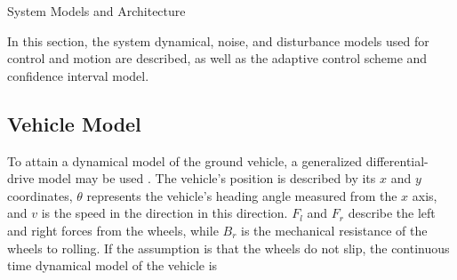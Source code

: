 \begin{section}{System Models and Architecture}
	
\label{sec:modeling}
In this section, the system dynamical, noise, and disturbance models used for control and motion are described, as well as the adaptive control scheme and confidence interval model.


\subsection{Vehicle Model}
To attain a dynamical model of the ground vehicle, a generalized differential-drive model may be used \cite{nutaro2011building}. The vehicle's position is described by its $x$ and $y$ coordinates, $\theta$ represents the vehicle's heading angle measured from the $x$ axis, and $v$ is the speed in the direction in this direction. $F_l$ and $F_r$ describe the left and right forces from the wheels, while $B_r$ is the mechanical resistance of the wheels to rolling. If the assumption is that the wheels do not slip, the continuous time dynamical model of the vehicle is



\end{section}
